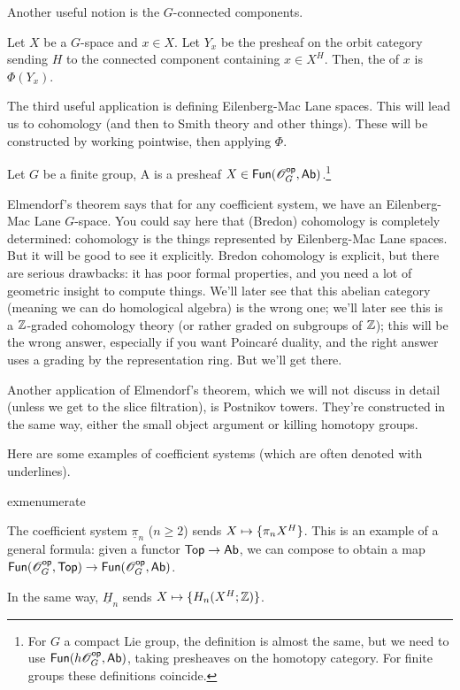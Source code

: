 Another useful notion is the $G$-connected components.
\begin{defn}
Let $X$ be a $G$-space and $x\in X$. Let $Y_x$ be the presheaf on the orbit category sending $H$ to the connected
component containing $x\in X^H$. Then, the  of $x$ is $\Phi(Y_x)$.
\end{defn}
The third useful application is defining Eilenberg-Mac Lane spaces. This will lead us to cohomology (and then to
Smith theory and other things). These will be constructed by working pointwise, then applying $\Phi$.
\begin{defn}
Let $G$ be a finite group, A  is a presheaf $X\in\mathsf{Fun}(\mathscr O_G^{\mathsf{op}}, \mathsf{Ab})$.\footnote{For $G$ a
compact Lie group, the definition is almost the same, but we need to use $\mathsf{Fun}(h\mathscr O_G^{\mathsf{op}}, \mathsf{Ab})$, taking presheaves
on the homotopy category. For finite groups these definitions coincide.}
\end{defn}
Elmendorf's theorem says that for any coefficient system, we have an Eilenberg-Mac Lane $G$-space. You could say
here that (Bredon) cohomology is completely determined: cohomology is the things represented by Eilenberg-Mac Lane
spaces. But it will be good to see it explicitly. Bredon cohomology is explicit, but there are serious drawbacks:
it has poor formal properties, and you need a lot of geometric insight to compute things. We'll later see that this
abelian category (meaning we can do homological algebra) is the wrong one; we'll later see this is a $\mathbb Z$-graded
cohomology theory (or rather graded on subgroups of $\mathbb Z$); this will be the wrong answer, especially if you want
Poincaré duality, and the right answer uses a grading by the representation ring. But we'll get there.
\begin{rem}
Another application of Elmendorf's theorem, which we will not discuss in detail (unless we get to the slice
filtration), is Postnikov towers. They're constructed in the same way, either the small object argument or killing
homotopy groups.
\end{rem}
Here are some examples of coefficient systems (which are often denoted with underlines).
\begin{comp}{exm}{enumerate}
	\item The coefficient system $\underline\pi_n$ ($n\ge 2$) sends $X\mapsto\set{\pi_nX^H}$. This is an example of
	a general formula: given a functor $\mathsf{Top}\to\mathsf{Ab}$, we can compose to obtain a map $\mathsf{Fun}(\mathscr O_G^{\mathsf{op}},
	\mathsf{Top})\to\mathsf{Fun}(\mathscr O_G^{\mathsf{op}}, \mathsf{Ab})$.
	\item In the same way, $\underline H_n$ sends $X\mapsto\set{H_n(X^H;\Z)}$.\qedhere
\end{comp}
